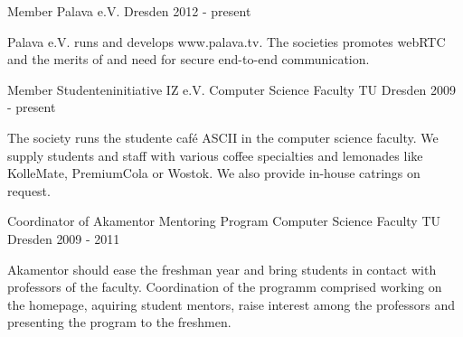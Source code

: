 \begin{cventries}
  \cventry
    {Member Palava e.V.}
    {}
    {Dresden}
    {2012 - present}
    {
      \begin{cvitems}
      \item[] {Palava e.V. runs and develops www.palava.tv. The societies promotes
      webRTC and the merits of and need for secure end-to-end communication.}
      \end{cvitems}
    }
  \cventry
    {Member Studenteninitiative IZ e.V.}
    {Computer Science Faculty}
    {TU Dresden}
    {2009 - present}
    {
      \begin{cvitems}
      \item[] {The society runs the studente caf\'{e} ASCII in the computer science
      faculty. We supply students and staff with various coffee specialties and
      lemonades like KolleMate, PremiumCola or Wostok. We also provide in-house
      catrings on request.}
      \end{cvitems}
    }
  \cventry
    {Coordinator of Akamentor Mentoring Program}
    {Computer Science Faculty}
    {TU Dresden}
    {2009 - 2011}
    {
      \begin{cvitems}
      \item[] {Akamentor should ease the freshman year and bring students in contact
      with professors of the faculty. Coordination of the programm comprised
      working on the homepage, aquiring student mentors, raise interest among
      the professors and presenting the program to the freshmen.}
      \end{cvitems}
    }
\end{cventries}

